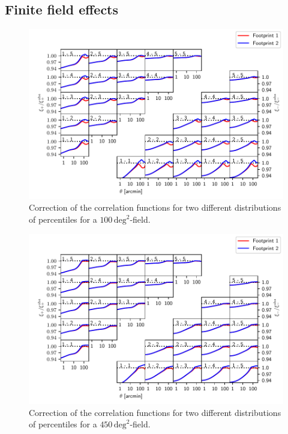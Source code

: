 \documentclass[referee]{aa} %
\renewcommand{\[}{\begin{equation}}
\renewcommand{\]}{\end{equation}}
\renewcommand{\rm}{\mathrm}
\begin{document}
\begin{appendix}
\subsection{Finite field effects}

\begin{figure}[h]
\centering
\includegraphics[width=\textwidth]{images/100degtwofoot_final.pdf}
\caption[Correction of the correlation functions for a $100\,\rm{deg}^2$-field.] {Correction of the correlation functions for two different distributions of percentiles for a $100\,\rm{deg}^2$-field.}
\label{fig:100degsqr}
\end{figure}

\begin{figure}[h]
\centering
\includegraphics[width=\textwidth]{images/450degtwofoot_final.pdf}
\caption[Correction of the correlation functions for a $450\,\rm{deg}^2$-field.] {Correction of the correlation functions for two different distributions of percentiles for a $450\,\rm{deg}^2$-field.}
\label{fig:450degsqr}
\end{figure}


\end{appendix}
\end{document}
